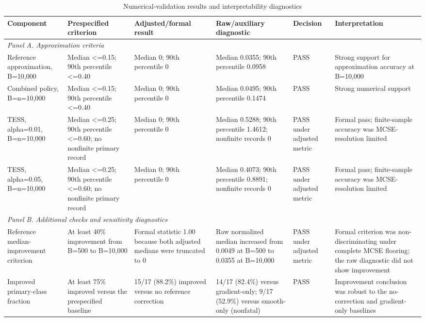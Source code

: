 \begin{table}[htbp]
\centering
\caption{Numerical-validation results and interpretability diagnostics}
\label{tab:validation-results}
\scriptsize
\begin{tabularx}{\textwidth}{p{} p{} p{} p{} p{} X}
\toprule
Component & Prespecified criterion & Adjusted/formal result & Raw/auxiliary diagnostic & Decision & Interpretation \\
\midrule
\multicolumn{6}{l}{\textit{Panel A. Approximation criteria}} \\
Reference approximation, B=10,000 & Median <=0.15; 90th percentile <=0.40 & Median 0; 90th percentile 0 & Median 0.0355; 90th percentile 0.0958 & PASS & Strong support for approximation accuracy at B=10,000 \\
Combined policy, B=n=10,000 & Median <=0.15; 90th percentile <=0.40 & Median 0; 90th percentile 0 & Median 0.0495; 90th percentile 0.1474 & PASS & Strong numerical support \\
TESS, alpha=0.01, B=n=10,000 & Median <=0.25; 90th percentile <=0.60; no nonfinite primary record & Median 0; 90th percentile 0 & Median 0.5288; 90th percentile 1.4612; nonfinite records 0 & PASS under adjusted metric & Formal pass; finite-sample accuracy was MCSE-resolution limited \\
TESS, alpha=0.05, B=n=10,000 & Median <=0.25; 90th percentile <=0.60; no nonfinite primary record & Median 0; 90th percentile 0 & Median 0.4073; 90th percentile 0.8891; nonfinite records 0 & PASS under adjusted metric & Formal pass; finite-sample accuracy was MCSE-resolution limited \\
\midrule
\multicolumn{6}{l}{\textit{Panel B. Additional checks and sensitivity diagnostics}} \\
Reference median-improvement criterion & At least 40\% improvement from B=500 to B=10,000 & Formal statistic 1.00 because both adjusted medians were truncated to 0 & Raw normalized median increased from 0.0049 at B=500 to 0.0355 at B=10,000 & PASS under adjusted metric & Formal criterion was non-discriminating under complete MCSE flooring; the raw diagnostic did not show improvement \\
Improved primary-class fraction & At least 75\% improved versus the prespecified baseline & 15/17 (88.2\%) improved versus no reference correction & 14/17 (82.4\%) versus gradient-only; 9/17 (52.9\%) versus smooth-only (nonfatal) & PASS & Improvement conclusion was robust to the no-correction and gradient-only baselines \\

\end{tabularx}
\end{table}
